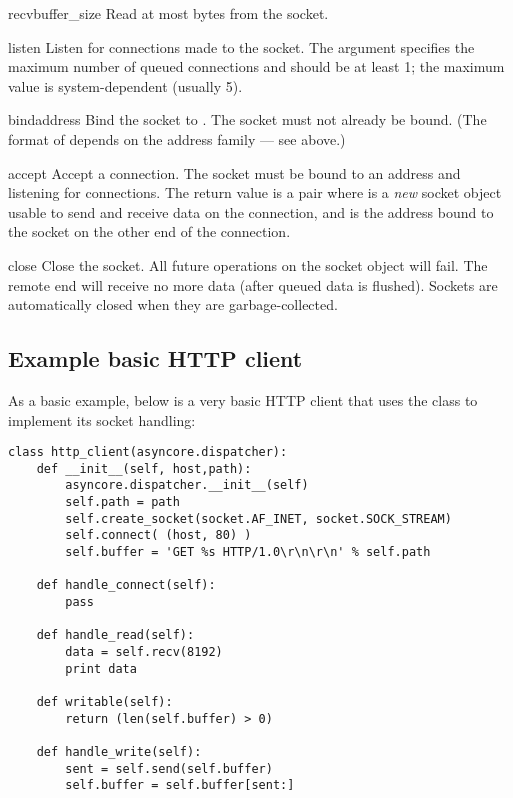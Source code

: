 \begin{methoddesc}{recv}{buffer_size}
  Read at most  bytes from the socket.
\end{methoddesc}

\begin{methoddesc}{listen}{}
  Listen for connections made to the socket.  The 
  argument specifies the maximum number of queued connections
  and should be at least 1; the maximum value is
  system-dependent (usually 5).
\end{methoddesc}

\begin{methoddesc}{bind}{address}
  Bind the socket to .  The socket must not already
  be bound.  (The format of  depends on the address
  family --- see above.)
\end{methoddesc}

\begin{methoddesc}{accept}{}
  Accept a connection.  The socket must be bound to an address
  and listening for connections.  The return value is a pair
   where  is a
  \emph{new} socket object usable to send and receive data on
  the connection, and  is the address bound to the
  socket on the other end of the connection.
\end{methoddesc}

\begin{methoddesc}{close}{}
  Close the socket.  All future operations on the socket object
  will fail.  The remote end will receive no more data (after
  queued data is flushed).  Sockets are automatically closed
  when they are garbage-collected.
\end{methoddesc}


\subsection{Example basic HTTP client \label{asyncore-example}}

As a basic example, below is a very basic HTTP client that uses the 
 class to implement its socket handling:

\begin{verbatim}
class http_client(asyncore.dispatcher):
    def __init__(self, host,path):
        asyncore.dispatcher.__init__(self)
        self.path = path
        self.create_socket(socket.AF_INET, socket.SOCK_STREAM)
        self.connect( (host, 80) )
        self.buffer = 'GET %s HTTP/1.0\r\n\r\n' % self.path
        
    def handle_connect(self):
        pass
        
    def handle_read(self):
        data = self.recv(8192)
        print data
        
    def writable(self):
        return (len(self.buffer) > 0)
    
    def handle_write(self):
        sent = self.send(self.buffer)
        self.buffer = self.buffer[sent:]
\end{verbatim}
